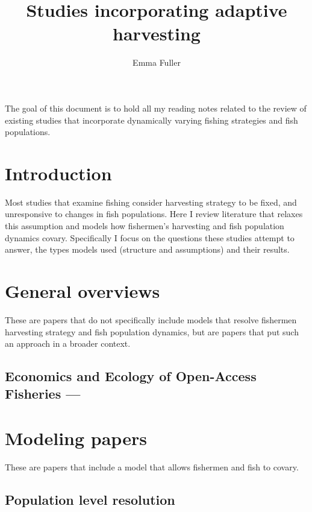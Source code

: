 \documentclass[12pt, a4paper]{article}
\title{Studies incorporating adaptive harvesting}
\author{Emma Fuller}
\date{} 	%
\begin{document}
\maketitle

\noindent The goal of this document is to hold all my reading notes related to the review of existing studies that incorporate dynamically varying fishing strategies and fish populations. 

\tableofcontents

\section{Introduction}

Most studies that examine fishing consider harvesting strategy to be fixed, and unresponsive to changes in fish populations. Here I review literature that relaxes this assumption and models how fishermen's harvesting and fish population dynamics covary. Specifically I focus on the questions these studies attempt to answer, the types models used (structure and assumptions) and their results. 

\section{General overviews}

These are papers that do not specifically include models that resolve fishermen harvesting strategy and fish population dynamics, but are papers that put such an approach in a broader context. 

\subsection{Economics and Ecology of Open-Access Fisheries --- \cite{Fulleretal2013}}

\section{Modeling papers}

These are papers that include a model that allows fishermen and fish to covary. 

\subsection{Population level resolution}
\end{document}
